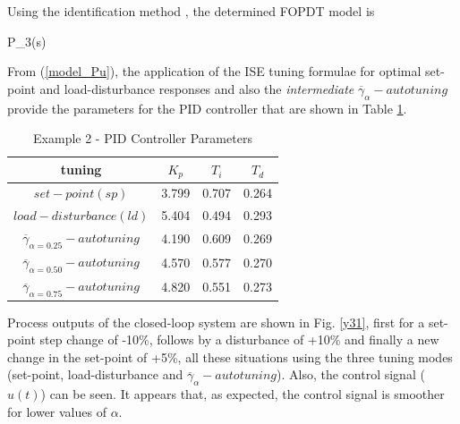 Using the identification method \cite{alfaro2006-1}, the
determined FOPDT model is

\be
    P_3(s) \approx {}
    \label{model_Pu}
\ee

From (\ref{model_Pu}), the application of the ISE tuning formulae
for optimal set-point and load-disturbance responses and also the
\emph{intermediate} $\overline{\gamma}_{\alpha}-autotuning$
provide the parameters for the PID controller that are shown in
Table \ref{PID_parameters3}.

\begin{table}[h!]
\begin{center}
\caption{Example 2 - PID Controller Parameters}
\begin{tabular}{c|ccc}
\hline \textbf{tuning}               &$K_p$ &$T_i$ &$T_d$\\ \hline
$set-point(sp)$                               &3.799  &0.707  &0.264 \\
$load-disturbance(ld)$                        &5.404  &0.494  &0.293 \\
\hline
$\overline{\gamma}_{\alpha=0.25}-autotuning$  &4.190  &0.609  &0.269 \\
$\overline{\gamma}_{\alpha=0.50}-autotuning$  &4.570  &0.577  &0.270 \\
$\overline{\gamma}_{\alpha=0.75}-autotuning$  &4.820  &0.551  &0.273 \\
\hline
\end{tabular}
\label{PID_parameters3}
\end{center}
\end{table}

Process outputs of the closed-loop system are shown in Fig.
\ref{y31}, first for a set-point step change of -10\%, follows by
a disturbance of +10\% and finally a new change in the set-point
of +5\%, all these situations using the three tuning modes
(set-point, load-disturbance and
$\overline{\gamma}_{\alpha}-autotuning$). Also, the control signal
($u(t)$) can be seen. It appears that, as expected, the control
signal is smoother for lower values of $\alpha$.

